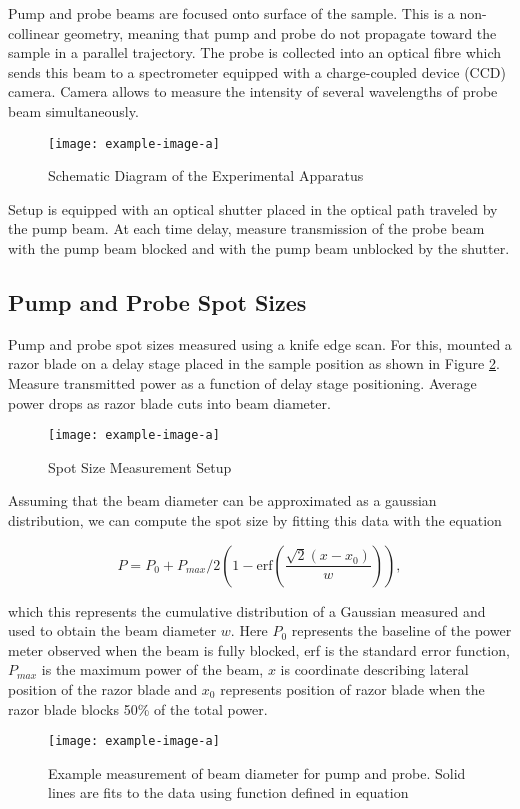 Pump and probe beams are focused onto surface of the sample. This is a non-collinear geometry, meaning that pump and probe do not propagate toward the sample in a parallel trajectory. The probe is collected into an optical fibre which sends this beam to a spectrometer equipped with a charge-coupled device (CCD) camera. Camera allows to measure the intensity of several wavelengths of probe beam simultaneously. 

\begin{figure}[h]
	\centering
	\texttt{[image: example-image-a]}
	\caption{ Schematic Diagram of the Experimental Apparatus}
	\label{fig:sample_absorbance}
\end{figure}


Setup is equipped with an optical shutter placed in the optical path traveled by the pump beam. At each time delay, measure transmission of the probe beam with the pump beam blocked and with the pump beam unblocked by the shutter. 


\subsection{Pump and Probe Spot Sizes}
Pump and probe spot sizes measured using a knife edge scan. For this, mounted a razor blade on a delay stage placed in the sample position as shown in Figure \ref{fig:beam_diameter_setup}. Measure transmitted power as a function of delay stage positioning. Average power drops as razor blade cuts into beam diameter. 

\begin{figure}[h]
	\centering
	\texttt{[image: example-image-a]}
	\caption{Spot Size Measurement Setup}
	\label{fig:beam_diameter_setup}
\end{figure}

Assuming that the beam diameter can be approximated as a gaussian distribution, we can compute the spot size by fitting this data with the equation 

\begin{equation}
	P = P_0 + P_{max}/2 \left( 1 - \mathrm{erf} \left( \dfrac{\sqrt{2}(x - x_0)}{w} \right) \right),
\end{equation}

which this represents the cumulative distribution of a Gaussian measured and used to obtain the beam diameter $w$. Here $P_0$ represents the baseline of the power meter observed when the beam is fully blocked, erf is the standard error function, $P_{max}$ is the maximum power of the beam, $x$ is coordinate describing lateral position of the razor blade and $x_0$ represents position of razor blade when the razor blade blocks 50\% of the total power.  



\begin{figure}[h]
	\centering
	\texttt{[image: example-image-a]}
	\caption{Example measurement of beam diameter for pump and probe. Solid lines are fits to the data using function defined in equation}
		\label{fig:beam_diamter_measurement}
\end{figure}



